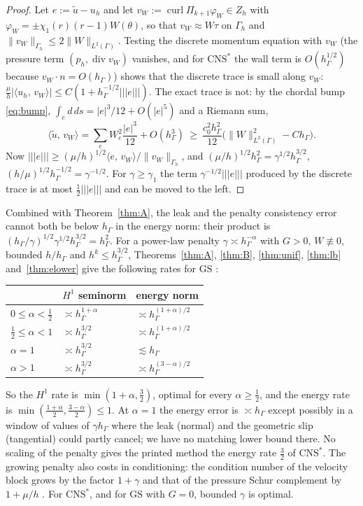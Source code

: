 \documentclass[pdflatex,sn-mathphys-num]{sn-jnl}
\theoremstyle{thmstyleone}
\theoremstyle{thmstylethree}
\newcommand{\hG}{h_\Gamma}
\newcommand{\Gh}{\Gamma_h}
\newcommand{\Zh}{Z_h}
\newcommand{\ut}{\tilde u}
\newcommand{\ip}[2]{\langle #1,\, #2\rangle}
\newcommand{\tnorm}[1]{|\!|\!|#1|\!|\!|}
\newcommand{\norm}[1]{\lVert #1\rVert}
\newcommand{\GS}{\mathrm{GS}}
\newcommand{\CNS}{\mathrm{CNS}^\ast}
\newcommand{\curl}{\operatorname{curl}}
\renewcommand{\div}{\operatorname{div}}
\begin{document}
\begin{proof}
Let $e:=\ut-u_h$ and let $v_W:=\curl\Pi_{k+1}\varphi_W\in\Zh$ with $\varphi_W=\pm\chi_1(r)(r-1)W(\theta)$, so that $v_W\approx W\tau$ on $\Gh$ and $\norm{v_W}_{\Gh}\le2\norm W_{L^2(\Gamma)}$. Testing the discrete momentum equation with $v_W$ (the pressure term $(p_h,\div v_W)$ vanishes, and for $\CNS$ the wall term is $O(\hG^{1/2})$ because $v_W\cdot n=O(\hG)$) shows that the discrete trace is small along $v_W$: $\frac\mu h|\ip{u_h}{v_W}|\le C(1+\hG^{-1/2}\tnorm e)$. The exact trace is not: by the chordal bump \eqref{eq:bump}, $\int_ed\,ds=|e|^3/12+O(|e|^5)$ and a Riemann sum,
\[
\ip{\ut}{v_W}=\sum_eW_e^2\frac{|e|^3}{12}+O(\hG^3)\ \ge\ \frac{c_0^2\hG^2}{12}\bigl(\norm W^2_{L^2(\Gamma)}-C\hG\bigr).
\]
Now $\tnorm e\ge(\mu/h)^{1/2}\ip{e}{v_W}/\norm{v_W}_{\Gh}$, and $(\mu/h)^{1/2}\hG^2=\gamma^{1/2}\hG^{3/2}$, $(h/\mu)^{1/2}\hG^{-1/2}=\gamma^{-1/2}$. For $\gamma\ge\gamma_1$ the term $\gamma^{-1/2}\tnorm e$ produced by the discrete trace is at most $\frac12\tnorm e$ and can be moved to the left.
\end{proof}
Combined with Theorem~\ref{thm:A}, the leak and the penalty consistency error cannot both be below $\hG$ in the energy norm: their product is $(\hG/\gamma)^{1/2}\gamma^{1/2}\hG^{3/2}=\hG^2$. For a power-law penalty $\gamma\asymp\hG^{-\alpha}$ with $G>0$, $W\not\equiv0$, bounded $h/\hG$ and $h^k\le\hG^{3/2}$, Theorems~\ref{thm:A}, \ref{thm:B}, \ref{thm:unif}, \ref{thm:lb} and~\ref{thm:elower} give the following rates for $\GS$ \cite{PadhiExt}:
\begin{center}\small
\begin{tabular}{lll}
\toprule
& $H^1$ seminorm & energy norm\\
\midrule
$0\le\alpha<\frac12$ & $\asymp\hG^{1+\alpha}$ & $\asymp\hG^{(1+\alpha)/2}$\\
$\frac12\le\alpha<1$ & $\asymp\hG^{3/2}$ & $\asymp\hG^{(1+\alpha)/2}$\\
$\alpha=1$ & $\asymp\hG^{3/2}$ & $\lesssim\hG$\\
$\alpha>1$ & $\asymp\hG^{3/2}$ & $\asymp\hG^{(3-\alpha)/2}$\\
\bottomrule
\end{tabular}
\end{center}
So the $H^1$ rate is $\min(1+\alpha,\frac32)$, optimal for every $\alpha\ge\frac12$, and the energy rate is $\min(\frac{1+\alpha}2,\frac{3-\alpha}2)\le1$. At $\alpha=1$ the energy error is $\asymp\hG$ except possibly in a window of values of $\gamma\hG$ where the leak (normal) and the geometric slip (tangential) could partly cancel; we have no matching lower bound there. No scaling of the penalty gives the printed method the energy rate $\frac32$ of $\CNS$. The growing penalty also costs in conditioning: the condition number of the velocity block grows by the factor $1+\gamma$ and that of the pressure Schur complement by $1+\mu/h$ \cite{PadhiExt}. For $\CNS$, and for $\GS$ with $G=0$, bounded $\gamma$ is optimal.
\end{document}
